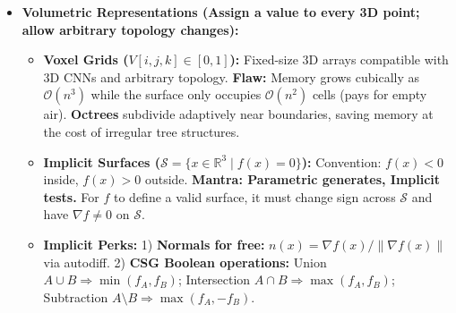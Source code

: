 \documentclass[10pt, a4paper]{article}
\begin{document}
\begin{itemize}
\begin{itemize}
        \item \textbf{Triangle Meshes ($V \in \mathbb{R}^{N \times 3}, F \in \mathbb{Z}^{M \times 3}$):} Piecewise linear surfaces. Separate \textbf{geometry ($V$, float, differentiable)} from \textbf{topology ($F$, int, discrete/combinatorial)}. Gradient descent can move vertices $V$, but cannot easily change $F$ or change genus (e.g., torus $\leftrightarrow$ sphere).
        \item \textbf{Mesh Properties:} Winding order $(a,b,c)$ sets the outward normal $n = (b-a) \times (c-a)$; swapping two indices flips the normal. For closed genus-0 meshes, Euler's formula ($V - E + F = 2$ with $E = 3F/2$) yields $F = 2V - 4 \approx 2V$. Ray-triangle intersection uses \textbf{barycentric coordinates} $p = \alpha a + \beta b + \gamma c$ ($\alpha+\beta+\gamma=1, \ge 0$), which also interpolate UV textures.
        \item \textbf{Parametric Surfaces ($f(u) = x \in \mathbb{R}^3, u \in \mathcal{M} \subset \mathbb{R}^2$):} E.g., B\'ezier patches. \emph{Easy to sample/generate points} (plug in $u$), \emph{hard to test inside/outside or intersect rays}, and topology is locked to the domain $\mathcal{M}$.
    \end{itemize}
    \item \textbf{Volumetric Representations (Assign a value to every 3D point; allow arbitrary topology changes):}
    \begin{itemize}
        \item \textbf{Voxel Grids ($V[i,j,k] \in [0,1]$):} Fixed-size 3D arrays compatible with 3D CNNs and arbitrary topology. \textbf{Flaw:} Memory grows cubically as $\mathcal{O}(n^3)$ while the surface only occupies $\mathcal{O}(n^2)$ cells (pays for empty air). \textbf{Octrees} subdivide adaptively near boundaries, saving memory at the cost of irregular tree structures.
        \item \textbf{Implicit Surfaces ($\mathcal{S} = \{x \in \mathbb{R}^3 \mid f(x) = 0\}$):} Convention: $f(x)<0$ inside, $f(x)>0$ outside. \textbf{Mantra: Parametric generates, Implicit tests.} For $f$ to define a valid surface, it must change sign across $\mathcal{S}$ and have $\nabla f \neq 0$ on $\mathcal{S}$.
        \item \textbf{Implicit Perks:}
        1) \textbf{Normals for free:} $n(x) = \nabla f(x) / \|\nabla f(x)\|$ via autodiff.
        2) \textbf{CSG Boolean operations:} Union $A \cup B \Rightarrow \min(f_A, f_B)$; Intersection $A \cap B \Rightarrow \max(f_A, f_B)$; Subtraction $A \setminus B \Rightarrow \max(f_A, -f_B)$.

\end{itemize}
\end{itemize}
\end{document}
